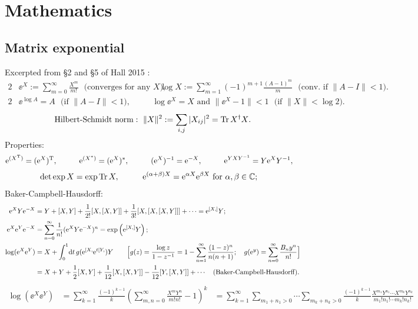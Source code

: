 \documentclass[CheatSheet]{subfiles}
\begin{document}
\detailstyle
\section{Mathematics}
\subsection{Matrix exponential}
Excerpted from \S2 and \S5 of Hall 2015 \cite{Hall2015}:
\begin{alignat}{2}
 &\ee^X := \sum_{m=0}^\infty \frac{X^m}{m!} \text{~~(converges for any $X$)},
\quad&
 &\log X := \sum_{m=1}^\infty (-1)^{m+1}\frac{(A-1)^m}{m} \text{~~(conv.~if $\|A-I\|<1$)}.
\end{alignat}
\begin{alignat}{2}
 &\ee^{\log A} = A \text{~~(if $\|A-I\|<1$)},
\quad&
 &\log \ee^X = X \text{~and~} \|\ee^X-1\| < 1 \text{~~(if $\|X\|<\log2$).}
\end{alignat}
\begin{equation}
 \text{Hilbert-Schmidt norm}:~\|X\|^2 := \sum_{i,j}|X_{ij}|^2 = {\operatorname{\mathrm{Tr}} X^\dagger X}.
\end{equation}
Properties:
\begin{alignat*}{4}
 {\mathrm{e}}^{(X^{\mathrm{T}})} &= ({\mathrm{e}}^X)^{\mathrm{T}},
&\qquad
 {\mathrm{e}}^{(X^*)} &= ({\mathrm{e}}^X)^*,
&\qquad
 ({\mathrm{e}}^X)^{-1} &= {\mathrm{e}}^{-X},
&\qquad
 {\mathrm{e}}^{YXY^{-1}} &= Y{\mathrm{e}}^X Y^{-1},
\end{alignat*}
\begin{alignat*}{2}
 \det \exp X &= \exp\operatorname{\mathrm{Tr}} X,
&\qquad
 {\mathrm{e}}^{(\alpha+\beta)X} &= {\mathrm{e}}^{\alpha X}{\mathrm{e}}^{\beta X} \text{~for $\alpha, \beta\in \mathbb C$};
\end{alignat*}
Baker-Campbell-Hausdorff:
\begin{align}
  {\mathrm{e}}^X Y {\mathrm{e}}^{-X}
&= Y + [X, Y] + \frac1{2!}[X, [X, Y]] + \frac1{3!}[X, [X, [X, Y]]] + \cdots = {\mathrm{e}}^{[X,]}Y;
\\
  {\mathrm{e}}^X {\mathrm{e}}^Y {\mathrm{e}}^{-X}
&= \sum_{n=0}^\infty\frac{1}{n!}({\mathrm{e}}^X Y {\mathrm{e}}^{-X})^n
 = \exp\left({\mathrm{e}}^{[X,]}Y\right);
\\
  \log({\mathrm{e}}^X {\mathrm{e}}^Y)
&= X + \int_0^1\!{\mathrm{d}} t\, g({\mathrm{e}}^{[X,}{\mathrm{e}}^{t[Y,})Y
\qquad\Bigl[
  g(z) = \frac{\log z}{1-z^{-1}} = 1-\sum_{n=1}^{\infty}\frac{(1-z)^n}{n(n+1)};
\quad
g({\mathrm{e}}^y)=\sum_{n=0}^{\infty}\frac{B_ny^n}{n!}
\Bigr]\\
&= X + Y + \frac12[X,Y] + \frac1{12}[X, [X,Y]] - \frac1{12}[Y, [X,Y]] + \cdots
\quad\text{(Baker-Campbell-Hausdorff).}
\end{align}
\begin{align}
   \log(\ee^X\ee^Y)
&=\sum_{k=1}^\infty \frac{(-1)^{k-1}}{k}\left(\sum_{m,n=0}^{\infty}\frac{X^mY^n}{m!n!}-1\right)^k
&=\sum_{k=1}^\infty
   \sum_{m_1+n_1>0}\cdots\sum_{m_k+n_k>0}\frac{(-1)^{k-1}}{k}
\frac{X^{m_1}Y^{n_1}\cdots X^{m_k}Y^{n_k}}{m_1!n_1!\cdots m_k!n_k!}
\end{align}
\end{document}

